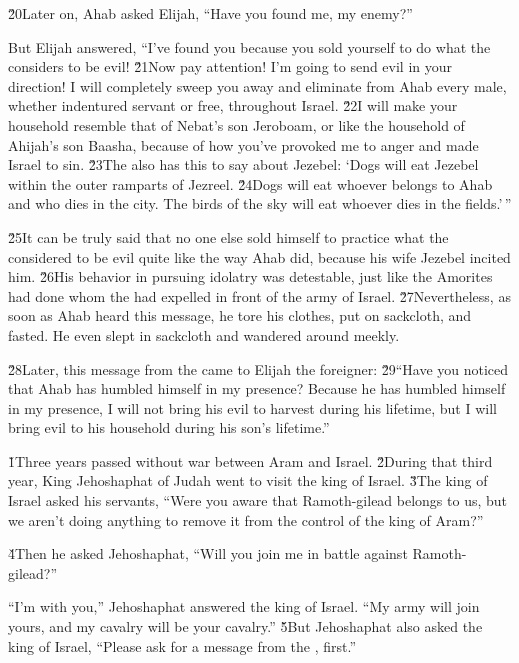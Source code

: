 \v{20}Later on, Ahab asked Elijah, ``Have you found me, my enemy?''

But Elijah answered, ``I've found you because you sold yourself to do what the  considers to be evil! \v{21}Now pay attention! I'm going to send evil in your direction! I will completely sweep you away and eliminate from Ahab every male, whether indentured servant or free, throughout Israel. \v{22}I will make your household resemble that of Nebat's son Jeroboam, or like the household of Ahijah's son Baasha, because of how you've provoked me to anger and made Israel to sin. \v{23}The  also has this to say about Jezebel: `Dogs will eat Jezebel within the outer ramparts of Jezreel. \v{24}Dogs will eat whoever belongs to Ahab and who dies in the city. The birds of the sky will eat whoever dies in the fields.'\,''

\v{25}It can be truly said that no one else sold himself to practice what the  considered to be evil quite like the way Ahab did, because his wife Jezebel incited him. \v{26}His behavior in pursuing idolatry was detestable, just like the Amorites had done whom the  had expelled in front of the army of Israel. \v{27}Nevertheless, as soon as Ahab heard this message, he tore his clothes, put on sackcloth, and fasted. He even slept in sackcloth and wandered around meekly.

\v{28}Later, this message from the  came to Elijah the foreigner: \v{29}``Have you noticed that Ahab has humbled himself in my presence? Because he has humbled himself in my presence, I will not bring his evil to harvest during his lifetime, but I will bring evil to his household during his son's lifetime.''

\v{1}Three years passed without war between Aram and Israel. \v{2}During that third year, King Jehoshaphat of Judah went to visit the king of Israel. \v{3}The king of Israel asked his servants, ``Were you aware that Ramoth-gilead belongs to us, but we aren't doing anything to remove it from the control of the king of Aram?''

\v{4}Then he asked Jehoshaphat, ``Will you join me in battle against Ramoth-gilead?''

``I'm with you,'' Jehoshaphat answered the king of Israel. ``My army will join yours, and my cavalry will be your cavalry.'' \v{5}But Jehoshaphat also asked the king of Israel, ``Please ask for a message from the , first.''

